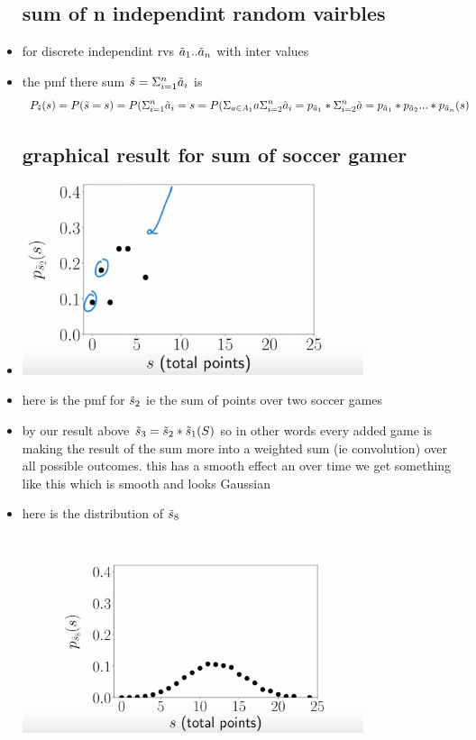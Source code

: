 \documentclass{article}
\begin{document}
\begin{itemize}
\subsection{sum of n independint random vairbles}
\item for discrete independint rvs $\Tilde{a}_1..\Tilde{a}_{n}$ with inter values 
\item the pmf there sum $\Tilde{s}=\Sigma_{i=1}^{n}\Tilde{a}_{i}$ is $$P_{\Tilde{s}}(s)=P(\Tilde{s}=s)=P(\Sigma_{i=1}^{n}\Tilde{a}_i=s=P(\Sigma_{a \in A_1} a\Sigma_{i=2}^{n}\Tilde{a}_i=p_{\Tilde{a}_1}* \Sigma_{i=2}^{n}\Tilde{a}=p_{\Tilde{a}_1}*p_{\Tilde{a}_2}...*p_{\Tilde{a}_n}(s)$$
\subsection{graphical result for sum of soccer gamer}
\item \includegraphics[width=10cm]{notes/week_4/vidio 1: Why Sums And Averages Tend To Look Gaussian/immages/v1_1.jpg}
\item here is the pmf for $\Tilde{s}_{2}$ ie the sum of points over two soccer games 
\item by our result above $\Tilde{s}_{3}=\Tilde{s}_{2}*\Tilde{s}_{1}(S)$ so in other words every added game is making the result of the sum more into a weighted sum  (ie convolution) over all possible outcomes. this has a smooth effect an over time we get something like this which is smooth and looks Gaussian 
\item here is the distribution of $\Tilde{s}_{8}\\$\includegraphics[width=10cm]{notes/week_4/vidio 1: Why Sums And Averages Tend To Look Gaussian/immages/v1_2.jpg}


\end{itemize}
\end{document}
